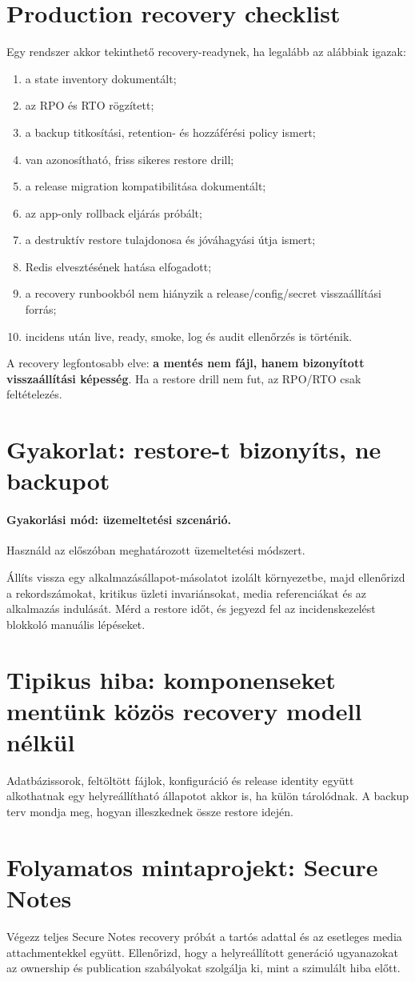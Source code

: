 \section{Production recovery checklist}

Egy rendszer akkor tekinthető recovery-readynek, ha legalább az alábbiak igazak:

\begin{enumerate}
  \item a state inventory dokumentált;
  \item az RPO és RTO rögzített;
  \item a backup titkosítási, retention- és hozzáférési policy ismert;
  \item van azonosítható, friss sikeres restore drill;
  \item a release migration kompatibilitása dokumentált;
  \item az app-only rollback eljárás próbált;
  \item a destruktív restore tulajdonosa és jóváhagyási útja ismert;
  \item Redis elvesztésének hatása elfogadott;
  \item a recovery runbookból nem hiányzik a release/config/secret visszaállítási forrás;
  \item incidens után live, ready, smoke, log és audit ellenőrzés is történik.
\end{enumerate}

A recovery legfontosabb elve: \textbf{a mentés nem fájl, hanem bizonyított visszaállítási képesség}. Ha a restore drill nem fut, az RPO/RTO csak feltételezés.

\section{Gyakorlat: restore-t bizonyíts, ne backupot}
\paragraph{Gyakorlási mód: üzemeltetési szcenárió.} Használd az előszóban meghatározott üzemeltetési módszert.

Állíts vissza egy alkalmazásállapot-másolatot izolált környezetbe, majd ellenőrizd a rekordszámokat, kritikus üzleti invariánsokat, media referenciákat és az alkalmazás indulását. Mérd a restore időt, és jegyezd fel az incidenskezelést blokkoló manuális lépéseket.

\section{Tipikus hiba: komponenseket mentünk közös recovery modell nélkül}
Adatbázissorok, feltöltött fájlok, konfiguráció és release identity együtt alkothatnak egy helyreállítható állapotot akkor is, ha külön tárolódnak. A backup terv mondja meg, hogyan illeszkednek össze restore idején.

\section{Folyamatos mintaprojekt: Secure Notes}
Végezz teljes Secure Notes recovery próbát a tartós adattal és az esetleges media attachmentekkel együtt. Ellenőrizd, hogy a helyreállított generáció ugyanazokat az ownership és publication szabályokat szolgálja ki, mint a szimulált hiba előtt.
